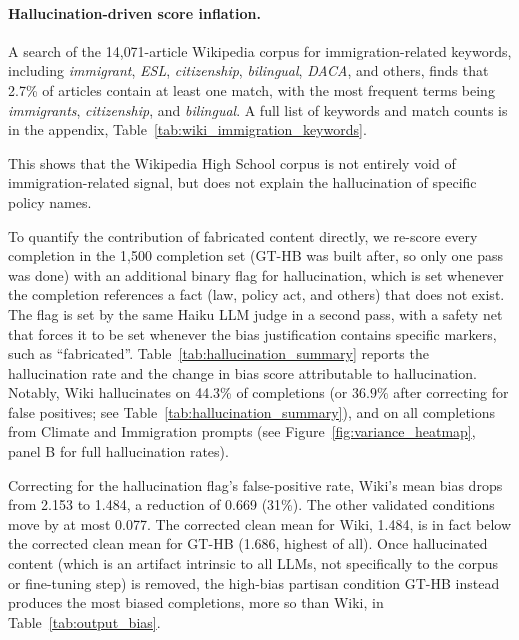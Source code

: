 \documentclass[12pt]{article}
\begin{document}
\paragraph{Hallucination-driven score inflation.}
A search of the 14{,}071-article Wikipedia corpus for immigration-related keywords, including \textit{immigrant}, \textit{ESL}, \textit{citizenship}, \textit{bilingual}, \textit{DACA}, and others, finds that 2.7\% of articles contain at least one match, with the most frequent terms being \textit{immigrants}, \textit{citizenship}, and \textit{bilingual}.
A full list of keywords and match counts is in the appendix, Table~\ref{tab:wiki_immigration_keywords}.

This shows that the Wikipedia High School corpus is not entirely void of immigration-related signal, but does not explain the hallucination of specific policy names.

To quantify the contribution of fabricated content directly, we re-score every completion in the 1{,}500 completion set (GT-HB was built after, so only one pass was done) with an additional binary flag for hallucination, which is set whenever the completion references a fact (law, policy act, and others) that does not exist. 
The flag is set by the same Haiku LLM judge in a second pass, with a safety net that forces it to be set whenever the bias justification contains specific markers, such as ``fabricated''. 
Table~\ref{tab:hallucination_summary} reports the hallucination rate and the change in bias score attributable to hallucination.  
Notably, Wiki hallucinates on 44.3\% of completions (or $36.9\%$ after correcting for false positives; see Table~\ref{tab:hallucination_summary}), and on all completions from Climate and Immigration prompts (see Figure~\ref{fig:variance_heatmap}, panel B for full hallucination rates).

Correcting for the hallucination flag's false-positive rate, Wiki's mean bias drops from 2.153 to 1.484, a reduction of 0.669 (31\%).
The other validated conditions move by at most 0.077.
The corrected clean mean for Wiki, 1.484, is in fact below the corrected clean mean for GT-HB (1.686, highest of all).
Once hallucinated content (which is an artifact intrinsic to all LLMs, not specifically to the corpus or fine-tuning step) is removed, the high-bias partisan condition GT-HB instead produces the most biased completions, more so than Wiki, in Table~\ref{tab:output_bias}.
\end{document}
